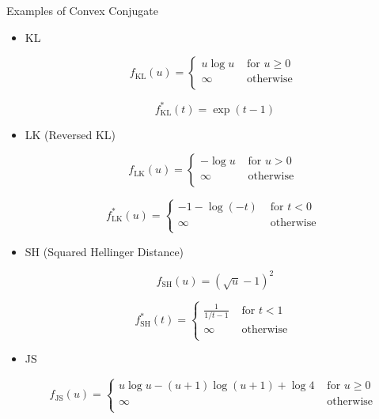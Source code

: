 \begin{frame}[allowframebreaks]

\begin{myexampleblock}{12.20}{Examples of Convex Conjugate}
    \begin{itemize}
        \item
        KL

        $$
        f_{\mathrm{KL}}(u)=
        \begin{cases}
        u \log u & \text { for } u \geq 0 \\
        \infty & \text { otherwise } \\
        \end{cases}
        $$

        $$
        f_{\mathrm{KL}}^{*}(t)=\exp(t-1)
        $$
        \item
        LK (Reversed KL)

        $$
        f_{\mathrm{LK}}(u)=
        \begin{cases}
        - 
            \log u & \text { for } u > 0 \\
        \infty & \text { otherwise } \\
        \end{cases}
        $$

        $$
        f_{\mathrm{LK}}^{*}(u)=
        \begin{cases}
        -1-\log(-t) & \text { for } t < 0 \\
        \infty & \text { otherwise } \\
        \end{cases}
        $$
        \item
        SH (Squared Hellinger Distance)

        $$
        f_{\mathrm{SH}}(u)=(\sqrt{u}-1)^2
        $$

        $$
        f_{\mathrm{SH}}^{*}(t)=
        \begin{cases}
        \frac{1}{1/t-1} & \text { for } t < 1 \\
        \infty & \text { otherwise } \\
        \end{cases}
        $$
        \item
        JS

        $$
        f_{\mathrm{JS}}(u)=
        \begin{cases}
        u\log u-(u+1) \log (u+1)+\log 4 & \text { for } u \geq 0 \\
        \infty & \text { otherwise } \\
        \end{cases}
        $$


\end{itemize}
\end{myexampleblock}
\end{frame}
